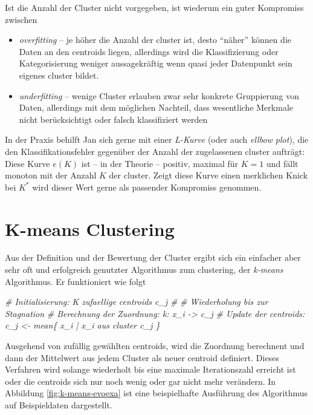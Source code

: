 \documentclass[]{book}
\newenvironment{Shaded}{\begin{snugshade}}{\end{snugshade}}
\newcommand{\CommentTok}[1]{\textcolor[rgb]{0.56,0.35,0.01}{\textit{#1}}}
\theoremstyle{definition}
\theoremstyle{definition}
\theoremstyle{definition}
\theoremstyle{definition}
\theoremstyle{remark}
\begin{document}
Ist die Anzahl der Cluster nicht vorgegeben, ist wiederum ein guter Kompromiss zwischen

\begin{itemize}
\item
  \emph{overfitting} -- je höher die Anzahl der cluster ist, desto ``näher'' können die Daten an den centroids liegen, allerdings wird die Klassifizierung oder Kategorisierung weniger aussagekräftig wenn quasi jeder Datenpunkt sein eigenes cluster bildet.
\item
  \emph{underfitting} -- wenige Cluster erlauben zwar sehr konkrete Gruppierung von Daten, allerdings mit dem möglichen Nachteil, dass wesentliche Merkmale nicht berücksichtigt oder falsch klassifiziert werden
\end{itemize}

In der Praxis behilft Jan sich gerne mit einer \emph{L-Kurve} (oder auch \emph{ellbow plot}), die den Klassifikationsfehler gegenüber der Anzahl der zugelassenen cluster aufträgt: Diese Kurve \(e(K)\) ist -- in der Theorie -- positiv, maximal für \(K=1\) und fällt monoton mit der Anzahl \(K\) der cluster. Zeigt diese Kurve einen merklichen Knick bei \(K^*\) wird dieser Wert gerne als passender Kompromiss genommen.

\hypertarget{k-means-clustering}{%
\section{K-means Clustering}\label{k-means-clustering}}

Aus der Definition und der Bewertung der Cluster ergibt sich ein einfacher aber sehr oft und erfolgreich genutzter Algorithmus zum clustering, der \emph{k-means} Algorithmus. Er funktioniert wie folgt

\begin{Shaded}
\begin{Highlighting}[numbers=left,,]
\CommentTok{# Initialisierung: K zufaellige centroids c_j}
\CommentTok{#}
\CommentTok{# Wiederholung bis zur Stagnation}
\CommentTok{#   Berechnung der Zuordnung: k: x_i -> c_j}
\CommentTok{#   Update der centroids: c_j <- mean\{ x_i | x_i aus cluster c_j \}}
\end{Highlighting}
\end{Shaded}

Ausgehend von zufällig gewählten centroids, wird die Zuordnung berechnent und dann der Mittelwert aus jedem Cluster als neuer centroid definiert. Dieses Verfahren wird solange wiederholt bis eine maximale Iterationszahl erreicht ist oder die centroids sich nur noch wenig oder gar nicht mehr verändern. In Abbildung \ref{fig:k-means-evoexa} ist eine beispielhafte Ausführung des Algorithmus auf Beispieldaten dargestellt.
\end{document}
